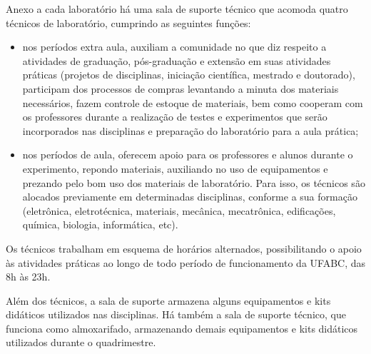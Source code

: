 Anexo a cada laboratório há uma sala de suporte técnico que acomoda quatro técnicos
de laboratório, cumprindo as seguintes funções:
\begin{itemize}
    \item nos períodos extra aula, auxiliam a comunidade no que diz respeito a
    atividades de graduação, pós-graduação e extensão em suas atividades
    práticas (projetos de disciplinas, iniciação científica, mestrado e
    doutorado), participam dos processos de compras levantando a minuta dos
    materiais necessários, fazem controle de estoque de materiais, bem como
    cooperam com os professores durante a realização de testes e experimentos
    que serão incorporados nas disciplinas e preparação do laboratório para a
    aula prática;
    \item nos períodos de aula, oferecem apoio para os professores e alunos
    durante o experimento, repondo materiais, auxiliando no uso de equipamentos
    e prezando pelo bom uso dos materiais de laboratório. Para isso, os
    técnicos são alocados previamente em determinadas disciplinas, conforme a
    sua formação (eletrônica, eletrotécnica, materiais, mecânica, mecatrônica,
    edificações, química, biologia, informática, etc).
\end{itemize}
Os técnicos trabalham em esquema de horários alternados, possibilitando o apoio
às atividades práticas ao longo de todo período de funcionamento da UFABC, das
8h às 23h.

Além dos técnicos, a sala de suporte armazena alguns equipamentos e kits
didáticos utilizados nas disciplinas. 
Há também a sala de suporte técnico, que funciona como almoxarifado,
armazenando demais equipamentos e kits didáticos utilizados durante o
quadrimestre.

